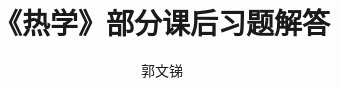 \documentclass{ctexart}                             %
\begin{document}
\title{《热学》部分课后习题解答}
\author{郭文锑}
\maketitle

\tableofcontents





\end{document}
